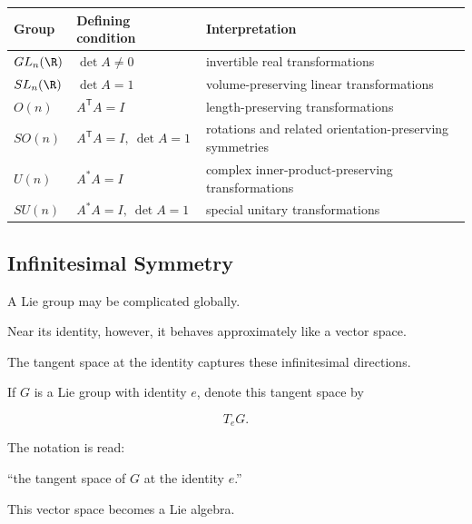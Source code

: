 \begin{center}
\begin{tabularx}{0.96\textwidth}{@{}lXX@{}}
\toprule
\textbf{Group} & \textbf{Defining condition} & \textbf{Interpretation}\\
\midrule
\(GL_n(\R)\) & \(\det A\neq0\) & invertible real transformations\\
\(SL_n(\R)\) & \(\det A=1\) & volume-preserving linear transformations\\
\(O(n)\) & \(A^{\mathsf T}A=I\) & length-preserving transformations\\
\(SO(n)\) & \(A^{\mathsf T}A=I,\ \det A=1\) & rotations and related orientation-preserving symmetries\\
\(U(n)\) & \(A^*A=I\) & complex inner-product-preserving transformations\\
\(SU(n)\) & \(A^*A=I,\ \det A=1\) & special unitary transformations\\
\bottomrule
\end{tabularx}
\end{center}

\subsection{Infinitesimal Symmetry}
\label{subsec:infinitesimal-symmetry}

A Lie group may be complicated globally.

Near its identity, however, it behaves approximately like a vector space.

The tangent space at the identity captures these infinitesimal directions.

If \(G\) is a Lie group with identity \(e\), denote this tangent space by

\[ T_eG. \]

The notation is read:

``the tangent space of \(G\) at the identity \(e\).''

This vector space becomes a Lie algebra.

\begin{center}
\end{center}

